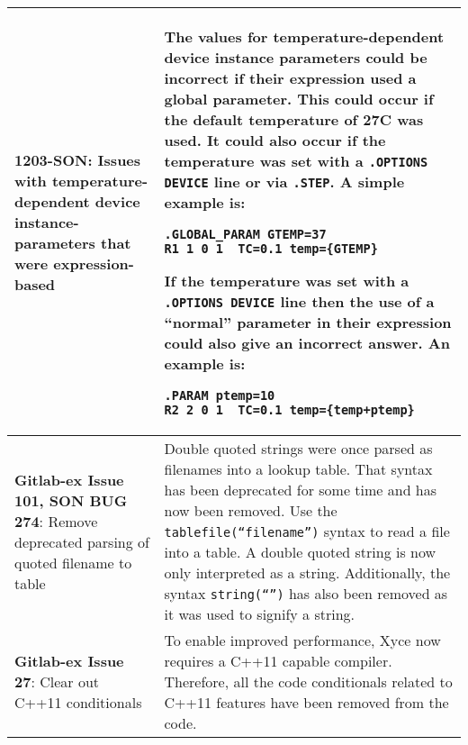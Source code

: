 {\begin{longtable}[h] {>{\raggedright\small}m{2in}|>{\raggedright\let\\\tabularnewline\small}m{3.5in}}
\textbf{1203-SON}: Issues with temperature-dependent device
instance-parameters that were expression-based & The values for
temperature-dependent device instance parameters could be incorrect
if their expression used a global parameter. This could occur if the
default temperature of 27C was used.  It could also occur if the
temperature was set with a \texttt{.OPTIONS DEVICE} line or via
\texttt{.STEP}.  A simple example is:
\begin{verbatim}
.GLOBAL_PARAM GTEMP=37
R1 1 0 1  TC=0.1 temp={GTEMP}
\end{verbatim}
If the temperature was set with a \texttt{.OPTIONS DEVICE} line then
the use of a ``normal'' parameter in their expression could also give
an incorrect answer.  An example is:
\begin{verbatim}
.PARAM ptemp=10
R2 2 0 1  TC=0.1 temp={temp+ptemp}
\end{verbatim}
\\ \hline

\textbf{Gitlab-ex Issue 101, SON BUG 274}:  Remove deprecated parsing of quoted filename to table &
Double quoted strings were once parsed as filenames into a lookup table.  That syntax 
has been deprecated for some time and has now been removed. Use the \texttt{tablefile(``filename'')}
syntax to read a file into a table.  A double quoted string is 
now only interpreted as a string.  Additionally, the syntax \texttt{string(``'')} 
has also been removed as it was used to signify a string.
\\ \hline

\textbf{Gitlab-ex Issue 27}:  Clear out C++11 conditionals&
To enable improved performance, Xyce now requires a C++11 capable compiler.
Therefore, all the code conditionals related to C++11 features have been
removed from the code. 
\\ \hline

\end{longtable}
}
